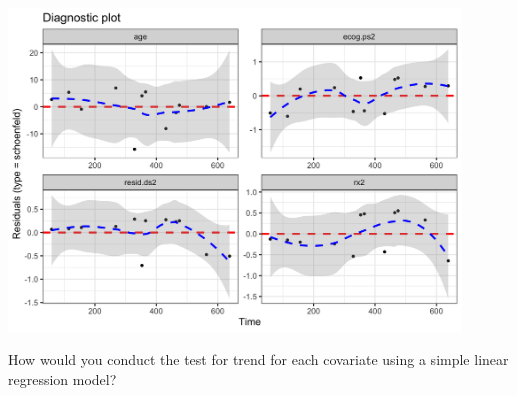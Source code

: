 \begin{center}
\includegraphics[width=0.9\textwidth]{img/ovarian-cox-diagnostics-schoenfeld.png}
\end{center}

\begin{question}{}
How would you conduct the test for trend for each covariate using a simple linear regression model?
\end{question}

